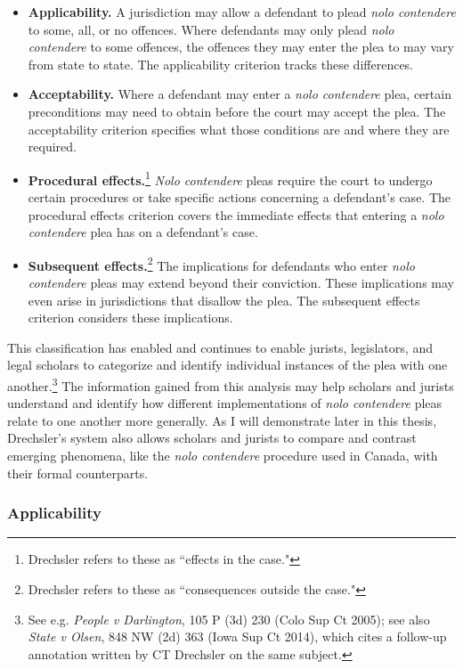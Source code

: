 \begin{itemize}
    \item \textbf{Applicability.} A jurisdiction may allow a defendant to plead \textit{nolo contendere} to some, all, or no offences. Where defendants may only plead \textit{nolo contendere} to some offences, the offences they may enter the plea to may vary from state to state. The applicability criterion tracks these differences.
    \item \textbf{Acceptability.} Where a defendant may enter a \textit{nolo contendere} plea, certain preconditions may need to obtain before the court may accept the plea. The acceptability criterion specifies what those conditions are and where they are required.
    \item \textbf{Procedural effects.}\footnote{Drechsler refers to these as ``effects in the case."} \textit{Nolo contendere} pleas require the court to undergo certain procedures or take specific actions concerning a defendant's case. The procedural effects criterion covers the immediate effects that entering a \textit{nolo contendere} plea has on a defendant's case.
    \item \textbf{Subsequent effects.}\footnote{Drechsler refers to these as ``consequences outside the case."} The implications for defendants who enter \textit{nolo contendere} pleas may extend beyond their conviction. These implications may even arise in jurisdictions that disallow the plea. The subsequent effects criterion considers these implications.
\end{itemize}
This classification has enabled and continues to enable jurists, legislators, and legal scholars to categorize and identify individual instances of the plea with one another.\footnote{See e.g. \textit{People v Darlington}, 105 P (3d) 230 (Colo Sup Ct 2005); see also \textit{State v Olsen}, 848 NW (2d) 363 (Iowa Sup Ct 2014), which cites a follow-up annotation written by CT Drechsler on the same subject.} The information gained from this analysis may help scholars and jurists understand and identify how different implementations of \textit{nolo contendere} pleas relate to one another more generally. As I will demonstrate later in this thesis, Drechsler's system also allows scholars and jurists to compare and contrast emerging phenomena, like the \textit{nolo contendere} procedure used in Canada, with their formal counterparts.

\subsubsection{Applicability}


